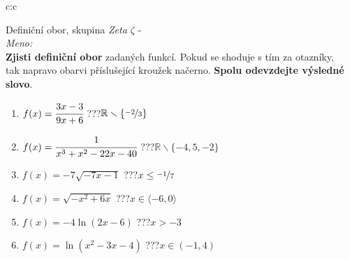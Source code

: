 \documentclass[10pt]{report}
\begin{document}
\newpage
\thispagestyle{empty}
\begin{tabular}{c:c}
\begin{minipage}[c][99mm][t]{0.49\linewidth}
\begin{center}
\vspace{7mm}
{\huge Definiční obor, skupina \textit{Zeta $\zeta$} -}\\[4.5mm]
\textit{Meno:}\phantom{xxxxxxxxxxxxxxxxxxxxxxxxxxxxxxxxxxxxxxxxxxxxxxxxxxxxxxxxxxxxxxxxx}\\[3.5mm]
\textbf{Zjisti definiční obor} zadaných funkcí. Pokud se shoduje s tím za otazníky,\\tak napravo obarvi příslušející kroužek načerno. \textbf{Spolu odevzdejte výsledné slovo}.\\[3mm]
\begin{minipage}{0.77\linewidth}
\begin{center}
\begin{varwidth}{\textwidth}
\begin{enumerate}
\normalsize
\item $f(x)=\cfrac{3x-3}{9x+6}$\quad \dotfill\; ???\;\dotfill \quad $\mathbb{R}\smallsetminus\{\nicefrac{-2}{3}\}$
\item $f(x)=\cfrac{1}{x^3+x^2-22x-40}$\quad \dotfill\; ???\;\dotfill \quad $\mathbb{R}\smallsetminus\{-4,5,-2\}$
\item $f(x)=-7\sqrt{-7x-1}$\quad \dotfill\; ???\;\dotfill \quad $x\leq\nicefrac{-1}{7}$
\item $f(x)=\sqrt{-x^2+6x}$\quad \dotfill\; ???\;\dotfill \quad $x\in\langle-6 , 0\rangle$
\item $f(x)=-4\ln{(2x-6)}$\quad \dotfill\; ???\;\dotfill \quad $x>-3$
\item $f(x)=\ln{(x^2-3x-4)}$\quad \dotfill\; ???\;\dotfill \quad $x\in(-1 , 4)$
\end{enumerate}
\end{varwidth}
\end{center}
\end{minipage}
\begin{minipage}{0.20\linewidth}

\end{minipage}
\end{center}
\end{minipage}
\end{tabular}
\end{document}

